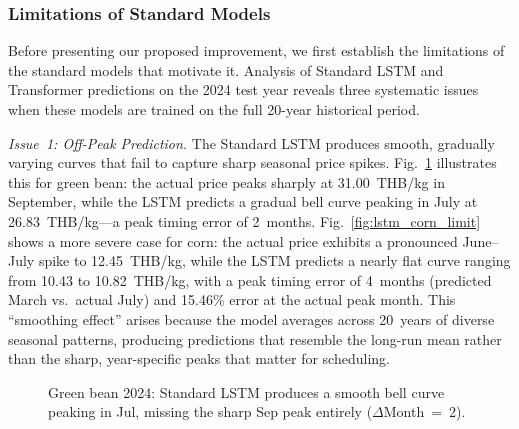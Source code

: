 \documentclass[journal]{IEEEtran}
\begin{document}
\subsubsection{Limitations of Standard Models}
\label{sec:limitations}

Before presenting our proposed improvement, we first establish the limitations of the standard models that motivate it. Analysis of Standard LSTM and Transformer predictions on the 2024 test year reveals three systematic issues when these models are trained on the full 20-year historical period.

\textit{Issue~1: Off-Peak Prediction.} The Standard LSTM produces smooth, gradually varying curves that fail to capture sharp seasonal price spikes. Fig.~\ref{fig:lstm_gb_limit} illustrates this for green bean: the actual price peaks sharply at 31.00~THB/kg in September, while the LSTM predicts a gradual bell curve peaking in July at 26.83~THB/kg---a peak timing error of 2~months. Fig.~\ref{fig:lstm_corn_limit} shows a more severe case for corn: the actual price exhibits a pronounced June--July spike to 12.45~THB/kg, while the LSTM predicts a nearly flat curve ranging from 10.43 to 10.82~THB/kg, with a peak timing error of 4~months (predicted March vs.\ actual July) and 15.46\% error at the actual peak month. This ``smoothing effect'' arises because the model averages across 20~years of diverse seasonal patterns, producing predictions that resemble the long-run mean rather than the sharp, year-specific peaks that matter for scheduling.

\begin{figure}[htbp]
  \centering
  \caption{Green bean 2024: Standard LSTM produces a smooth bell curve peaking in Jul, missing the sharp Sep peak entirely ($\Delta$Month~=~2).}
  \label{fig:lstm_gb_limit}
\end{figure}
\end{document}
